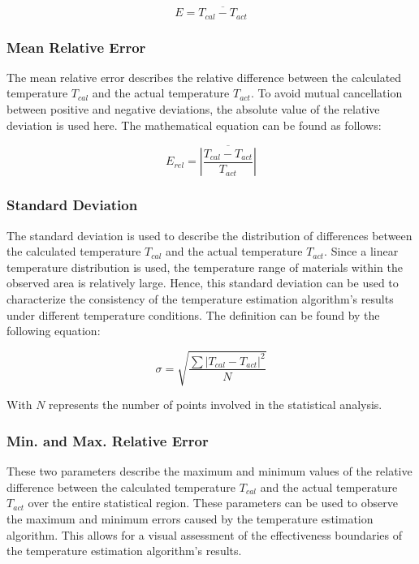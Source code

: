 \begin{equation}
    {E} = \overline{T_{cal} - T_{act}} 
\end{equation}

\subsubsection{Mean Relative Error}
The mean relative error describes the relative difference between the calculated 
temperature $T_{cal}$ and the actual temperature $T_{act}$. To avoid mutual 
cancellation between positive and negative deviations, the absolute value of 
the relative deviation is used here. The mathematical equation can be found as follows:

\begin{equation}
    {E}_{rel} = \overline{\left\lvert \frac{T_{cal} - T_{act}}{T_{act}}\right\rvert }
\end{equation}

\subsubsection{Standard Deviation}
The standard deviation is used to describe the distribution of differences 
between the calculated temperature $T_{cal}$ and the actual 
temperature $T_{act}$. Since a linear temperature distribution is used, the 
temperature range of materials within the observed area is relatively large. 
Hence, this standard deviation can be used to characterize the consistency of the 
temperature estimation algorithm's results under different temperature conditions.
The definition can be found by the following equation:

\begin{equation}
    \sigma = \sqrt{\frac{\sum {\left\lvert T_{cal} - T_{act}\right\rvert }^2}{N}} 
\end{equation}

With $N$ represents the number of points involved in the statistical analysis.

\subsubsection{Min. and Max. Relative Error}
These two parameters describe the maximum and minimum values of the relative 
difference between the calculated temperature $T_{cal}$ and the actual temperature 
$T_{act}$ over the entire statistical region. These parameters can be used to 
observe the maximum and minimum errors caused by the temperature estimation 
algorithm. This allows for a visual assessment of the effectiveness boundaries 
of the temperature estimation algorithm's results.


